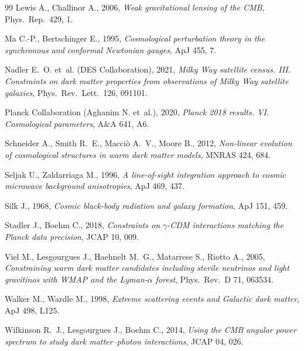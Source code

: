 \documentclass[11pt,a4paper]{article}
\begin{document}
\begin{thebibliography}{99}
Lewis A., Challinor A., 2006, \emph{Weak gravitational lensing of the CMB}, Phys.\ Rep.\ 429, 1.

Ma C.-P., Bertschinger E., 1995, \emph{Cosmological perturbation theory in the synchronous and conformal Newtonian gauges}, ApJ 455, 7.

Nadler E.~O. et~al. (DES Collaboration), 2021, \emph{Milky Way satellite census. III. Constraints on dark matter properties from observations of Milky Way satellite galaxies}, Phys.\ Rev.\ Lett.\ 126, 091101.

Planck Collaboration (Aghanim N. et~al.), 2020, \emph{Planck 2018 results. VI. Cosmological parameters}, A\&A 641, A6.

Schneider A., Smith R.~E., Macci\`o A.~V., Moore B., 2012, \emph{Non-linear evolution of cosmological structures in warm dark matter models}, MNRAS 424, 684.

Seljak U., Zaldarriaga M., 1996, \emph{A line-of-sight integration approach to cosmic microwave background anisotropies}, ApJ 469, 437.

Silk J., 1968, \emph{Cosmic black-body radiation and galaxy formation}, ApJ 151, 459.

Stadler J., Boehm C., 2018, \emph{Constraints on $\gamma$-CDM interactions matching the Planck data precision}, JCAP 10, 009.

Viel M., Lesgourgues J., Haehnelt M.~G., Matarrese S., Riotto A., 2005, \emph{Constraining warm dark matter candidates including sterile neutrinos and light gravitinos with WMAP and the Lyman-$\alpha$ forest}, Phys.\ Rev.\ D 71, 063534.

Walker M., Wardle M., 1998, \emph{Extreme scattering events and Galactic dark matter}, ApJ 498, L125.

Wilkinson R.~J., Lesgourgues J., Boehm C., 2014, \emph{Using the CMB angular power spectrum to study dark matter--photon interactions}, JCAP 04, 026.

\end{thebibliography}
\end{document}
